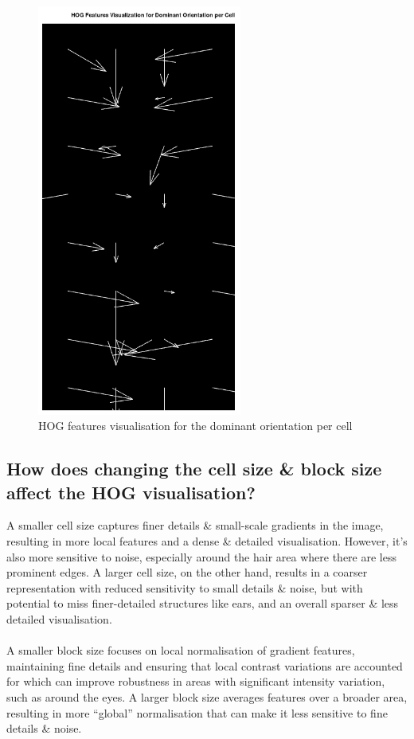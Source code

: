\documentclass[a4paper]{article}
\begin{document}
\begin{minipage}{0.49\textwidth}
\begin{figure}[H]
    \centering
    \includegraphics[width=0.6\textwidth]{./images/2_2_hog_features.png}
    \caption{HOG features visualisation for the dominant orientation per cell}
\end{figure}
\end{minipage}

\subsection{How does changing the cell size \& block size affect the HOG visualisation?}
A smaller cell size captures finer details \& small-scale gradients in the image, resulting in more local features and a dense \& detailed visualisation.
However, it's also more sensitive to noise, especially around the hair area where there are less prominent edges.
A larger cell size, on the other hand, results in a coarser representation with reduced sensitivity to small details \& noise, but with potential to miss finer-detailed structures like ears, and an overall sparser \& less detailed visualisation.
\\\\
A smaller block size focuses on local normalisation of gradient features, maintaining fine details and ensuring that local contrast variations are accounted for which can improve robustness in areas with significant intensity variation, such as around the eyes.
A larger block size averages features over a broader area, resulting in more ``global'' normalisation that can make it less sensitive to fine details \& noise.
\end{document}
